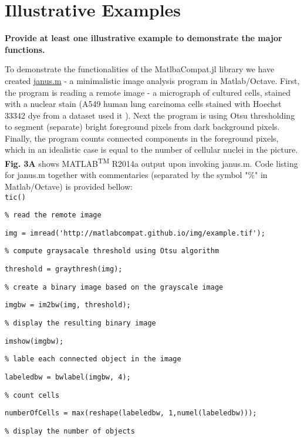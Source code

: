 \section{Illustrative Examples}

\textbf{Provide at least one illustrative example to demonstrate the major functions.}

To demonstrate the functionalities of the MatlbaCompat.jl library we have created \href{https://github.com/MatlabCompat/MatlabCompat.jl/blob/dev/test/janus.m}{janus.m} - a minimalistic image analysis program in Matlab/Octave. First, the program is reading a remote image - a micrograph of cultured cells, stained with a nuclear stain (A549 human lung carcinoma cells stained with Hoechst 33342 dye from a dataset used it \cite{22787215}). Next the program is using Otsu \cite{otsu1975threshold} thresholding to segment (separate) bright foreground pixels from dark background pixels. Finally, the program counts connected components in the foreground pixels, which in an idealistic case is equal to the number of cellular nuclei in the picture. \textbf{Fig. 3A} shows MATLAB\textsuperscript{TM} R2014a output upon invoking janus.m. Code listing for janus.m together with commentaries (separated by the symbol "\%" in Matlab/Octave) is provided bellow:\\



\verb|tic()|

\verb|% read the remote image|

\verb|img = imread('http://matlabcompat.github.io/img/example.tif');|

\verb|% compute graysacale threshold using Otsu algorithm|

\verb|threshold = graythresh(img);|

\verb|% create a binary image based on the grayscale image|

\verb|imgbw = im2bw(img, threshold);|

\verb|% display the resulting binary image|

\verb|imshow(imgbw);|

\verb|% lable each connected object in the image|

\verb|labeledbw = bwlabel(imgbw, 4);|

\verb|% count cells|

\verb|numberOfCells = max(reshape(labeledbw, 1,numel(labeledbw)));|

\verb|% display the number of objects|

